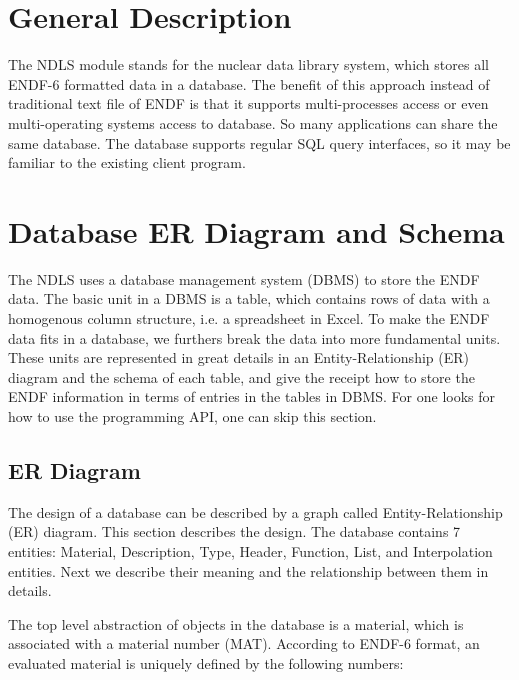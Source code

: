 \section{General Description}
The NDLS module stands for the nuclear data library system, which stores all ENDF-6 formatted data in a database. The benefit of this approach instead of traditional text file of ENDF is that it supports multi-processes access or even multi-operating systems access to database. So many applications can share the same database. The database supports regular SQL query interfaces, so it may be familiar to the existing client program. 

\section{Database ER Diagram and Schema}
The NDLS uses a database management system (DBMS) to store the ENDF data. The basic unit in a DBMS is a table, which contains rows of data with a homogenous column structure, i.e. a spreadsheet in Excel. To make the ENDF data fits in a database, we furthers break the data into more fundamental units. These units are represented in great details in an Entity-Relationship (ER) diagram and the schema of each table, and give the receipt how to store the ENDF information in terms of entries in the tables in DBMS. For one looks for how to use the programming API, one can skip this section.

\subsection{ER Diagram}
The design of a database can be described by a graph called Entity-Relationship (ER) diagram. This section describes the design. The database contains  7 entities: Material, Description, Type, Header, Function, List, and Interpolation entities. Next we describe their meaning and the relationship between them in details.

The top level abstraction of objects in the database is a material, which is associated with a material number (MAT). According to ENDF-6 format, an evaluated material is uniquely defined by the following numbers:

